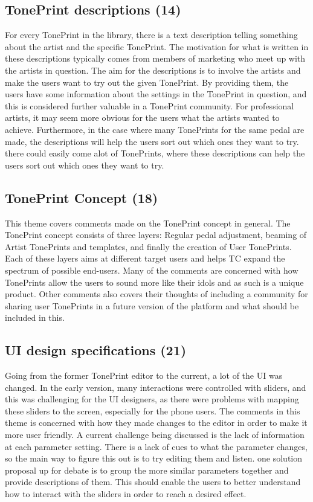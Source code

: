 \subsection*{TonePrint descriptions (14)} 
\label{App:ThemeTonePrintDescription}
For every TonePrint in the library, there is a text description telling something about the artist and the specific TonePrint. The motivation for what is written in these descriptions typically comes from members of marketing who meet up with the artists in question. The aim for the descriptions is to involve the artists and make the users want to try out the given TonePrint. By providing them, the users have some information about the settings in the TonePrint in question, and this is considered further valuable in a TonePrint community. For professional artists, it may seem more obvious for the users what the artists wanted to achieve. Furthermore, in the case where many TonePrints for the same pedal are made, the descriptions will help the users sort out which ones they want to try. there could easily come alot of TonePrints, where these descriptions can help the users sort out which ones they want to try. 

\subsection*{TonePrint Concept (18)}
\label{App:ThemeTonePrintConcept}
This theme covers comments made on the TonePrint concept in general. The TonePrint concept consists of three layers: Regular pedal adjustment, beaming of Artist TonePrints and templates, and finally the creation of User TonePrints. Each of these layers aims at different target users and helps TC expand the spectrum of possible end-users. Many of the comments are concerned with how TonePrints allow the users to sound more like their idols and as such is a unique product. Other comments also covers their thoughts of including a community for sharing user TonePrints in a future version of the platform and what should be included in this.

\subsection*{UI design specifications (21)}
\label{App:ThemeParameterUI}
Going from the former TonePrint editor to the current, a lot of the UI was changed. In the early version, many interactions were controlled with sliders, and this was challenging for the UI designers, as there were problems with mapping these sliders to the screen, especially for the phone users. The comments in this theme is concerned with how they made changes to the editor in order to make it more user friendly. A current challenge being discussed is the lack of information at each parameter setting. There is a lack of cues to what the parameter changes, so the main way to figure this out is to try editing them and listen. one solution proposal up for debate is to group the more similar parameters together and provide descriptions of them. This should enable the users to better understand how to interact with the sliders in order to reach a desired effect.


